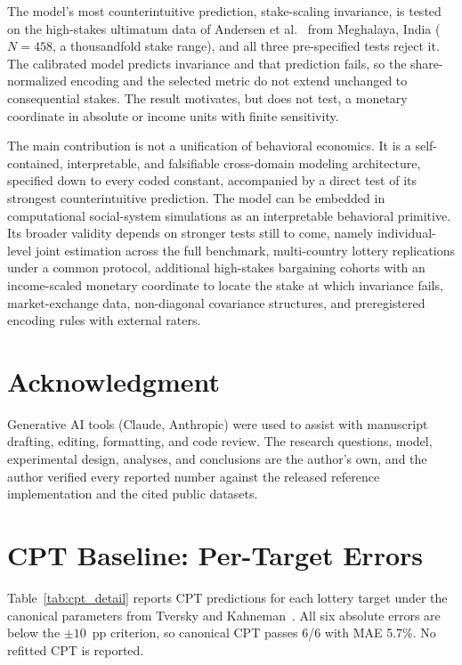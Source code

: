 \documentclass[journal]{IEEEtran}
\begin{document}
The model's most counterintuitive prediction, stake-scaling invariance, is tested on the high-stakes ultimatum data of Andersen et al.~\cite{andersen2011} from Meghalaya, India ($N=458$, a thousandfold stake range), and all three pre-specified tests reject it.
The calibrated model predicts invariance and that prediction fails, so the share-normalized encoding and the selected metric do not extend unchanged to consequential stakes.
The result motivates, but does not test, a monetary coordinate in absolute or income units with finite sensitivity.

The main contribution is not a unification of behavioral economics.
It is a self-contained, interpretable, and falsifiable cross-domain modeling architecture, specified down to every coded constant, accompanied by a direct test of its strongest counterintuitive prediction.
The model can be embedded in computational social-system simulations as an interpretable behavioral primitive.
Its broader validity depends on stronger tests still to come, namely individual-level joint estimation across the full benchmark, multi-country lottery replications under a common protocol, additional high-stakes bargaining cohorts with an income-scaled monetary coordinate to locate the stake at which invariance fails, market-exchange data, non-diagonal covariance structures, and preregistered encoding rules with external raters.

\section*{Acknowledgment}
Generative AI tools (Claude, Anthropic) were used to assist with manuscript drafting, editing, formatting, and code review.
The research questions, model, experimental design, analyses, and conclusions are the author's own, and the author verified every reported number against the released reference implementation and the cited public datasets.

\appendices
\section{CPT Baseline: Per-Target Errors}
\label{app:cpt}

Table~\ref{tab:cpt_detail} reports CPT predictions for each lottery target under the canonical parameters from Tversky and Kahneman~\cite{tversky1992}.
All six absolute errors are below the $\pm10$~pp criterion, so canonical CPT passes 6/6 with MAE 5.7\%.
No refitted CPT is reported.
\end{document}
